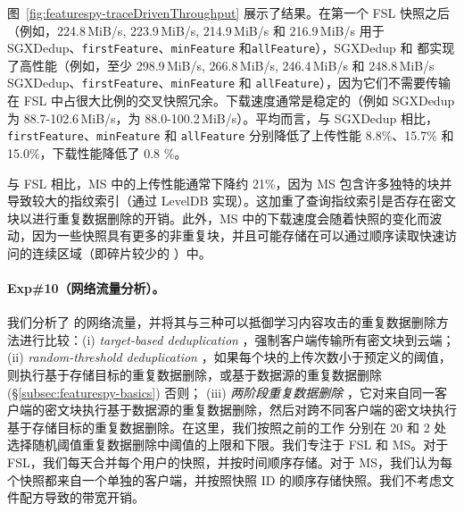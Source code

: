 图~\ref{fig:featurespy-traceDrivenThroughput} 展示了结果。在第一个 FSL 快照之后（例如，224.8\,MiB/s, 223.9\,MiB/s, 214.9\,MiB/s 和 216.9\,MiB/s 用于 SGXDedup、{\tt firstFeature}、{\tt minFeature} 和{\tt allFeature}），SGXDedup 和 \prototype 都实现了高性能（例如，至少 298.9\,MiB/s, 266.8\,MiB/s, 246.4\,MiB/s 和 248.8\,MiB/s SGXDedup、{\tt firstFeature}、{\tt minFeature} 和 {\tt allFeature}），因为它们不需要传输在 FSL 中占很大比例的交叉快照冗余。下载速度通常是稳定的（例如 SGXDedup 为 88.7-102.6\,MiB/s，\prototype 为 88.0-100.2\,MiB/s）。平均而言，与 SGXDedup 相比，{\tt firstFeature}、{\tt minFeature} 和 {\tt allFeature} 分别降低了上传性能 8.8\%、15.7\% 和 15.0\%，下载性能降低了 0.8 \%。

与 FSL 相比，MS 中的上传性能通常下降约 21\%，因为 MS 包含许多独特的块并导致较大的指纹索引（通过 LevelDB \cite{leveldb} 实现）。这加重了查询指纹索引是否存在密文块以进行重复数据删除的开销。此外，MS 中的下载速度会随着快照的变化而波动，因为一些快照具有更多的非重复块，并且可能存储在可以通过顺序读取快速访问的连续区域（即碎片较少的 \cite{lillibridge13}）中。


\paragraph*{Exp\#10（网络流量分析）。}
我们分析了 \prototype 的网络流量，并将其与三种可以抵御学习内容攻击的重复数据删除方法进行比较：(i) {\em target-based deduplication} \cite{harnik10}，强制客户端传输所有密文块到云端； (ii) {\em random-threshold deduplication} \cite{harnik10}，如果每个块的上传次数小于预定义的阈值，则执行基于存储目标的重复数据删除，或基于数据源的重复数据删除 (\S\ref{subsec:featurespy-basics}) 否则； (iii) {\em 两阶段重复数据删除} \cite{li15}，它对来自同一客户端的密文块执行基于数据源的重复数据删除，然后对跨不同客户端的密文块执行基于存储目标的重复数据删除。在这里，我们按照之前的工作 \cite{harnik10} 分别在 20 和 2 处选择随机阈值重复数据删除中阈值的上限和下限。我们专注于 FSL 和 MS。对于 FSL，我们每天合并每个用户的快照，并按时间顺序存储。对于 MS，我们认为每个快照都来自一个单独的客户端，并按照快照 ID 的顺序存储快照。我们不考虑文件配方导致的带宽开销。


